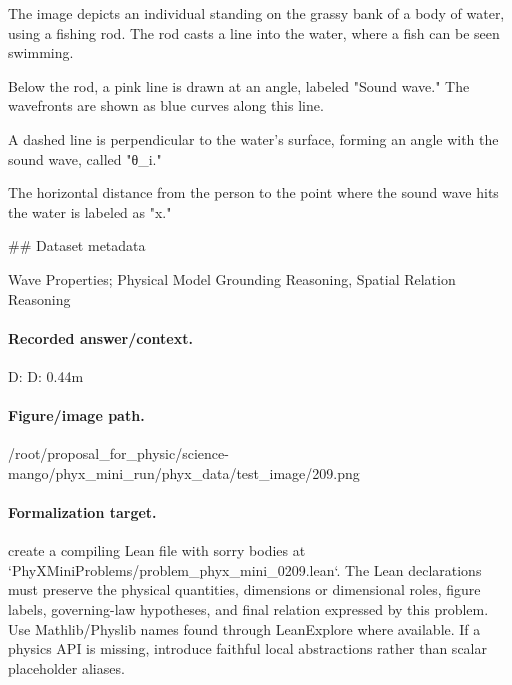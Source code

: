 The image depicts an individual standing on the grassy bank of a body of water, using a fishing rod. The rod casts a line into the water, where a fish can be seen swimming.

Below the rod, a pink line is drawn at an angle, labeled "Sound wave." The wavefronts are shown as blue curves along this line. 

A dashed line is perpendicular to the water's surface, forming an angle with the sound wave, called "θ\_i." 

The horizontal distance from the person to the point where the sound wave hits the water is labeled as "x."

\#\# Dataset metadata

Wave Properties; Physical Model Grounding Reasoning, Spatial Relation Reasoning

\paragraph{Recorded answer/context.}
D: D: 0.44m

\paragraph{Figure/image path.}
/root/proposal\_for\_physic/science-mango/phyx\_mini\_run/phyx\_data/test\_image/209.png

\paragraph{Formalization target.}
create a compiling Lean file with sorry bodies at `PhyXMiniProblems/problem\_phyx\_mini\_0209.lean`. The Lean declarations must preserve the physical quantities, dimensions or dimensional roles, figure labels, governing-law hypotheses, and final relation expressed by this problem.
Use Mathlib/Physlib names found through LeanExplore where available. If a physics API is missing, introduce faithful local abstractions rather than scalar placeholder aliases.

